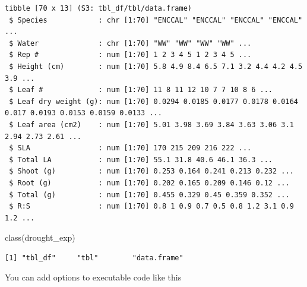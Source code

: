 \documentclass[
  letterpaper,
  DIV=11,
  numbers=noendperiod]{scrartcl}
\newenvironment{Shaded}{\begin{snugshade}}{\end{snugshade}}
\newcommand{\FunctionTok}[1]{\textcolor[rgb]{0.28,0.35,0.67}{#1}}
\newcommand{\NormalTok}[1]{\textcolor[rgb]{0.00,0.23,0.31}{#1}}
\begin{document}
\begin{verbatim}
tibble [70 x 13] (S3: tbl_df/tbl/data.frame)
 $ Species            : chr [1:70] "ENCCAL" "ENCCAL" "ENCCAL" "ENCCAL" ...
 $ Water              : chr [1:70] "WW" "WW" "WW" "WW" ...
 $ Rep #              : num [1:70] 1 2 3 4 5 1 2 3 4 5 ...
 $ Height (cm)        : num [1:70] 5.8 4.9 8.4 6.5 7.1 3.2 4.4 4.2 4.5 3.9 ...
 $ Leaf #             : num [1:70] 11 8 11 12 10 7 7 10 8 6 ...
 $ Leaf dry weight (g): num [1:70] 0.0294 0.0185 0.0177 0.0178 0.0164 0.017 0.0193 0.0153 0.0159 0.0133 ...
 $ Leaf area (cm2)    : num [1:70] 5.01 3.98 3.69 3.84 3.63 3.06 3.1 2.94 2.73 2.61 ...
 $ SLA                : num [1:70] 170 215 209 216 222 ...
 $ Total LA           : num [1:70] 55.1 31.8 40.6 46.1 36.3 ...
 $ Shoot (g)          : num [1:70] 0.253 0.164 0.241 0.213 0.232 ...
 $ Root (g)           : num [1:70] 0.202 0.165 0.209 0.146 0.12 ...
 $ Total (g)          : num [1:70] 0.455 0.329 0.45 0.359 0.352 ...
 $ R:S                : num [1:70] 0.8 1 0.9 0.7 0.5 0.8 1.2 3.1 0.9 1.2 ...
\end{verbatim}

\begin{Shaded}
\begin{Highlighting}[]
\FunctionTok{class}\NormalTok{(drought\_exp)}
\end{Highlighting}
\end{Shaded}

\begin{verbatim}
[1] "tbl_df"     "tbl"        "data.frame"
\end{verbatim}

You can add options to executable code like this
\end{document}
